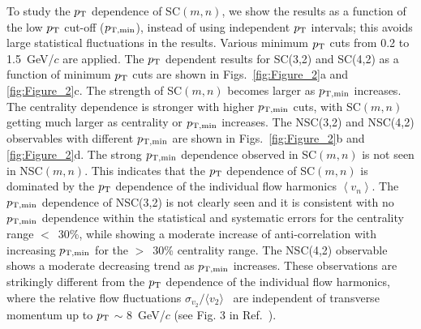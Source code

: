 To study the $p_{\rm T}$ dependence of SC$(m,n)$, we show the results as a function of the low $p_{\rm T}$ cut-off ($p_{\rm T, min}$), instead of using independent $p_{\rm T}$ intervals; this avoids large statistical fluctuations in the results. Various minimum $p_{\rm T}$ cuts from 0.2 to 1.5~GeV/$c$ are applied.
The $p_{\rm T}$ dependent results for SC(3,2) and SC(4,2) as a function of minimum $p_{\rm T}$ cuts are shown in Figs.~\ref{fig:Figure_2}a and \ref{fig:Figure_2}c.
The strength of SC$(m,n)$ becomes larger as $p_{\rm T, min}$ increases. 
The centrality dependence is stronger with higher $p_{\rm T, min}$ cuts, with SC$(m,n)$ getting much larger as centrality or $p_{\rm T, min}$ increases. 
The NSC(3,2) and NSC(4,2) observables with different $p_{\rm T, min}$ are shown in Figs.~\ref{fig:Figure_2}b and \ref{fig:Figure_2}d.
The strong $p_{\rm T, min}$ dependence observed in SC$(m,n)$ is not seen in NSC$(m,n)$. 
This indicates that the $p_{\rm T}$ dependence of SC$(m,n)$ is dominated by the $p_{\rm T}$  dependence of the individual flow harmonics $\left<v_n\right>$. 
The $p_{\rm T, min}$ dependence of NSC(3,2) is not clearly seen and it is consistent with no $p_{\rm T, min}$ dependence within the statistical and systematic errors for the centrality range $<$~30\%, while showing a moderate increase of anti-correlation with increasing $p_{\rm T, min}$ for the $>$~30\% centrality range.
The NSC(4,2) observable shows a moderate decreasing trend as $p_{\rm T, min}$ increases. These observations are strikingly different from the $p_{\rm T}$ dependence of the individual flow harmonics, where the relative flow fluctuations $\sigma_{v_2}/\langle v_{2} \rangle$~\cite{Voloshin:2008dg} are independent of transverse momentum up to $p_{\rm T}$ $\sim$ 8~GeV/$c$ (see Fig. 3 in Ref.~\cite{Abelev:2012di}).

